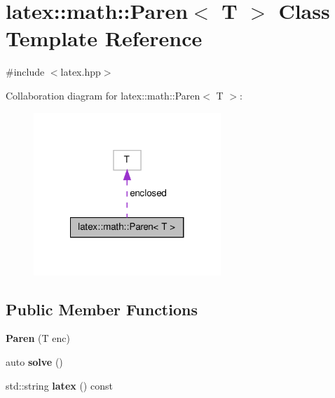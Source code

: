\hypertarget{classlatex_1_1math_1_1Paren}{\section{latex\-:\-:math\-:\-:\-Paren$<$ \-T $>$ \-Class \-Template \-Reference}
\label{classlatex_1_1math_1_1Paren}
}


{\ttfamily \#include $<$latex.\-hpp$>$}



\-Collaboration diagram for latex\-:\-:math\-:\-:\-Paren$<$ \-T $>$\-:
\nopagebreak
\begin{figure}[H]
\begin{center}
\leavevmode
\includegraphics[width=200pt]{classlatex_1_1math_1_1Paren__coll__graph}
\end{center}
\end{figure}
\subsection*{\-Public \-Member \-Functions}
\begin{DoxyCompactItemize}
\item 
\hypertarget{classlatex_1_1math_1_1Paren_a92ee4e0a519162e5c81ee889fdffb6ac}{{\bfseries \-Paren} (\-T enc)}\label{classlatex_1_1math_1_1Paren_a92ee4e0a519162e5c81ee889fdffb6ac}

\item 
\hypertarget{classlatex_1_1math_1_1Paren_aa64116c67d309121e19040fb3677da6a}{auto {\bfseries solve} ()}\label{classlatex_1_1math_1_1Paren_aa64116c67d309121e19040fb3677da6a}

\item 
\hypertarget{classlatex_1_1math_1_1Paren_a1f98ca0b80126f3df1ac5343788790ca}{std\-::string {\bfseries latex} () const }\label{classlatex_1_1math_1_1Paren_a1f98ca0b80126f3df1ac5343788790ca}

\end{DoxyCompactItemize}
